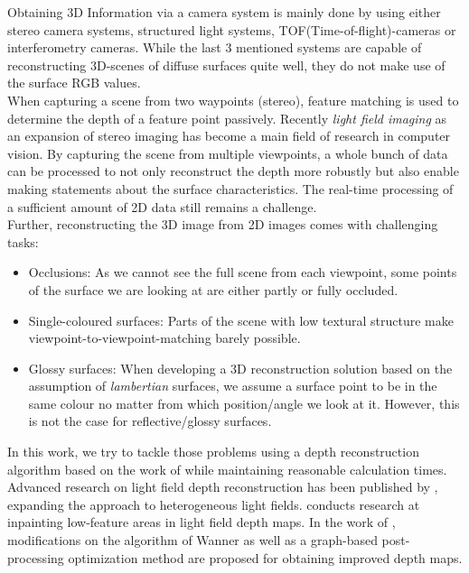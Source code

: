 \documentclass  [
  paper    = a4,
  BCOR     = 10mm,
  twoside,
  fontsize = 12pt,
  fleqn,
  toc      = bibnumbered,
  toc      = listofnumbered,
  numbers  = noendperiod,
  headings = normal,
  listof   = leveldown,
  version  = 3.03
]                                       {scrreprt}
\begin{document}
Obtaining 3D Information via a camera system is mainly done by using either stereo camera systems, structured light systems, TOF(Time-of-flight)-cameras or interferometry cameras. While the last 3 mentioned systems are capable of reconstructing 3D-scenes of diffuse surfaces quite well, they do not make use of the surface RGB values.\\
When capturing a scene from two waypoints (stereo), feature matching is used to determine the depth of a feature point passively. 
Recently \textit{light field imaging} as an expansion of stereo imaging has become a main field of research in computer vision. By capturing the scene from multiple viewpoints, a whole bunch of data can be processed to not only reconstruct the depth more robustly but also enable making statements about the surface characteristics. The real-time processing of a sufficient amount of 2D data still remains a challenge. \\
Further, reconstructing the 3D image from 2D images comes with challenging tasks:
\begin{itemize}
	\item Occlusions: As we cannot see the full scene from each viewpoint, some points of the surface we are looking at are either partly or fully occluded.
	\item Single-coloured surfaces: Parts of the scene with low textural structure make viewpoint-to-viewpoint-matching barely possible.
	\item Glossy surfaces: When developing a 3D reconstruction solution based on the assumption of \textit{lambertian} surfaces, we assume a surface point to be in the same colour no matter from which position/angle we look at it. However, this is not the case for reflective/glossy surfaces.
\end{itemize}
In this work, we try to tackle those problems using a depth reconstruction algorithm based on the work of \cite{wanner2014orientation} while maintaining reasonable calculation times.\\
Advanced research on light field depth reconstruction has been published by \cite{diebold2016light}, expanding the approach to heterogeneous light fields. \cite{schoenpflug2017optimizing} conducts research at inpainting low-feature areas in light field depth maps. In the work of \cite{freist2018reconst}, modifications on the algorithm of Wanner as well as a graph-based post-processing optimization method are proposed for obtaining improved depth maps.
\end{document}
